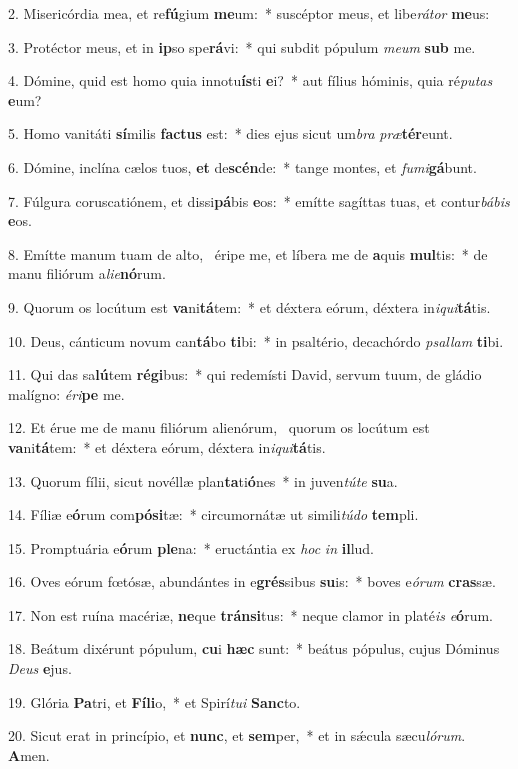 2. Misericórdia mea, et re\textbf{fú}gium \textbf{me}um:~*  suscéptor meus, et libe\textit{rá}\textit{tor} \textbf{me}us:\

3. Protéctor meus, et in \textbf{ip}so spe\textbf{rá}vi:~*  qui subdit pópulum \textit{me}\textit{um} \textbf{sub} me.\

4. Dómine, quid est homo quia innotu\textbf{ís}ti \textbf{e}i?~*  aut fílius hóminis, quia ré\textit{pu}\textit{tas} \textbf{e}um?\

5. Homo vanitáti \textbf{sí}milis \textbf{fac}\textbf{tus} est:~*  dies ejus sicut um\textit{bra} \textit{præ}\textbf{tér}eunt.\

6. Dómine, inclína cælos tuos, \textbf{et} de\textbf{scén}de:~*  tange montes, et \textit{fu}\textit{mi}\textbf{gá}bunt.\

7. Fúlgura coruscatiónem, et dissi\textbf{pá}bis \textbf{e}os:~*  emítte sagíttas tuas, et contur\textit{bá}\textit{bis} \textbf{e}os.\

8. Emítte manum tuam de alto, \dag\  éripe me, et líbera me de \textbf{a}quis \textbf{mul}tis:~*  de manu filiórum a\textit{li}\textit{e}\textbf{nó}rum.\

9. Quorum os locútum est \textbf{va}ni\textbf{tá}tem:~*  et déxtera eórum, déxtera in\textit{i}\textit{qui}\textbf{tá}tis.\

10. Deus, cánticum novum can\textbf{tá}bo \textbf{ti}bi:~*  in psaltério, decachórdo \textit{psal}\textit{lam} \textbf{ti}bi.\

11. Qui das sa\textbf{lú}tem \textbf{ré}\textbf{gi}bus:~*  qui redemísti David, servum tuum, de gládio malígno: \textit{é}\textit{ri}\textbf{pe} me.\

12. Et érue me de manu filiórum alienórum, \dag\  quorum os locútum est \textbf{va}ni\textbf{tá}tem:~*  et déxtera eórum, déxtera in\textit{i}\textit{qui}\textbf{tá}tis.\

13. Quorum fílii, sicut novéllæ plan\textbf{ta}ti\textbf{ó}nes~*  in juven\textit{tú}\textit{te} \textbf{su}a.\

14. Fíliæ e\textbf{ó}rum com\textbf{pó}\textbf{si}tæ:~*  circumornátæ ut simili\textit{tú}\textit{do} \textbf{tem}pli.\

15. Promptuária e\textbf{ó}rum \textbf{ple}na:~*  eructántia ex \textit{hoc} \textit{in} \textbf{il}lud.\

16. Oves eórum fœtósæ, abundántes in e\textbf{grés}sibus \textbf{su}is:~*  boves e\textit{ó}\textit{rum} \textbf{cras}sæ.\

17. Non est ruína macériæ, \textbf{ne}que \textbf{tráns}\textbf{i}tus:~*  neque clamor in platé\textit{is} \textit{e}\textbf{ó}rum.\

18. Beátum dixérunt pópulum, \textbf{cu}i \textbf{hæc} sunt:~*  beátus pópulus, cujus Dóminus \textit{De}\textit{us} \textbf{e}jus.\

19. Glória \textbf{Pa}tri, et \textbf{Fí}\textbf{li}o,~*  et Spirí\textit{tu}\textit{i} \textbf{Sanc}to.\

20. Sicut erat in princípio, et \textbf{nunc}, et \textbf{sem}per,~*  et in sǽcula sæcu\textit{ló}\textit{rum}. \textbf{A}men.\

